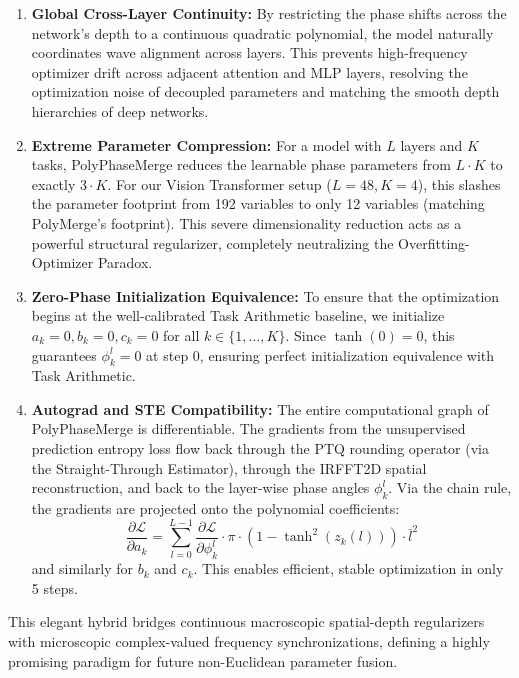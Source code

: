 \documentclass{article}
\theoremstyle{plain}
\theoremstyle{definition}
\theoremstyle{remark}
\begin{document}
\begin{enumerate}
    \item \textbf{Global Cross-Layer Continuity:} By restricting the phase shifts across the network's depth to a continuous quadratic polynomial, the model naturally coordinates wave alignment across layers. This prevents high-frequency optimizer drift across adjacent attention and MLP layers, resolving the optimization noise of decoupled parameters and matching the smooth depth hierarchies of deep networks.
    \item \textbf{Extreme Parameter Compression:} For a model with $L$ layers and $K$ tasks, PolyPhaseMerge reduces the learnable phase parameters from $L \cdot K$ to exactly $3 \cdot K$. For our Vision Transformer setup ($L=48, K=4$), this slashes the parameter footprint from 192 variables to only 12 variables (matching PolyMerge's footprint). This severe dimensionality reduction acts as a powerful structural regularizer, completely neutralizing the Overfitting-Optimizer Paradox.
    \item \textbf{Zero-Phase Initialization Equivalence:} To ensure that the optimization begins at the well-calibrated Task Arithmetic baseline, we initialize $a_k = 0, b_k = 0, c_k = 0$ for all $k \in \{1, \dots, K\}$. Since $\tanh(0) = 0$, this guarantees $\phi_k^l = 0$ at step 0, ensuring perfect initialization equivalence with Task Arithmetic.
    \item \textbf{Autograd and STE Compatibility:} The entire computational graph of PolyPhaseMerge is differentiable. The gradients from the unsupervised prediction entropy loss flow back through the PTQ rounding operator (via the Straight-Through Estimator), through the IRFFT2D spatial reconstruction, and back to the layer-wise phase angles $\phi_k^l$. Via the chain rule, the gradients are projected onto the polynomial coefficients:
    \begin{equation}
        \frac{\partial \mathcal{L}}{\partial a_k} = \sum_{l=0}^{L-1} \frac{\partial \mathcal{L}}{\partial \phi_k^l} \cdot \pi \cdot \left(1 - \tanh^2(z_k(l))\right) \cdot \bar{l}^2
    \end{equation}
    and similarly for $b_k$ and $c_k$. This enables efficient, stable optimization in only 5 steps.
\end{enumerate}
This elegant hybrid bridges continuous macroscopic spatial-depth regularizers with microscopic complex-valued frequency synchronizations, defining a highly promising paradigm for future non-Euclidean parameter fusion.
\end{document}
